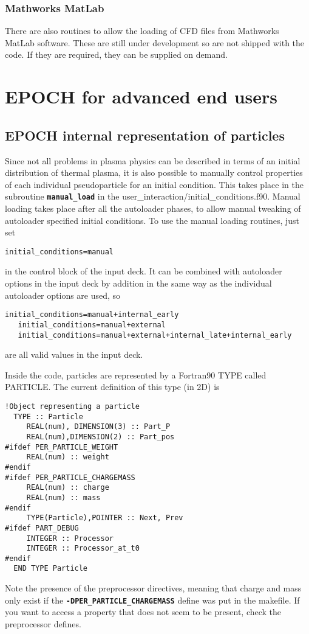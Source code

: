 \documentclass[12pt]{article}
\newcommand{\simpleboxverbatim}{\begin{Verbatim}[obeytabs=true,frame=single,
  framerule=0.5mm,rulecolor=\color{warwickmid}]}
\newcommand{\inlinecode}[1]{{\color{warwickred} \bf\texttt{#1}}}
\newcommand{\nEPOCH}{{\color{warwickdark}\fontfamily{phv}\selectfont EPOCH}}
\newcommand{\EPOCH}{{\nEPOCH} }
\begin{document}
\subsubsection{Mathworks MatLab}
There are also routines to allow the loading of CFD files from Mathworks
MatLab software. These are still under development so are not shipped with the
code. If they are required, they can be supplied on demand.

\section{\EPOCH for advanced end users}

\subsection{\EPOCH internal representation of particles}
Since not all problems in plasma physics can be described in terms of an
initial distribution of thermal plasma, it is also possible to manually
control properties of each individual pseudoparticle for an initial
condition. This takes place in the subroutine \inlinecode{manual\_load} in the
user\_interaction/initial\_conditions.f90. Manual loading takes place after
all the autoloader phases, to allow manual tweaking of autoloader specified
initial conditions. To use the manual loading routines, just set\\
\simpleboxverbatim
   initial_conditions=manual
\end{Verbatim}
in the control block of the input deck. It can be combined with autoloader
options in the input deck by addition in the same way as the individual
autoloader options are used, so
\simpleboxverbatim
   initial_conditions=manual+internal_early
   initial_conditions=manual+external
   initial_conditions=manual+external+internal_late+internal_early
\end{Verbatim}
are all valid values in the input deck.

Inside the code, particles are represented by a Fortran90 TYPE called
PARTICLE. The current definition of this type (in 2D) is

\simpleboxverbatim
!Object representing a particle
  TYPE :: Particle
     REAL(num), DIMENSION(3) :: Part_P
     REAL(num),DIMENSION(2) :: Part_pos
#ifdef PER_PARTICLE_WEIGHT
     REAL(num) :: weight
#endif
#ifdef PER_PARTICLE_CHARGEMASS
     REAL(num) :: charge
     REAL(num) :: mass
#endif
     TYPE(Particle),POINTER :: Next, Prev
#ifdef PART_DEBUG
     INTEGER :: Processor
     INTEGER :: Processor_at_t0
#endif
  END TYPE Particle
\end{Verbatim}
Note the presence of the preprocessor directives, meaning that charge and mass
only exist if the \inlinecode{-DPER\_PARTICLE\_CHARGEMASS} define was put in
the makefile. If you want to access a property that does not seem to be
present, check the preprocessor defines.
\end{document}
